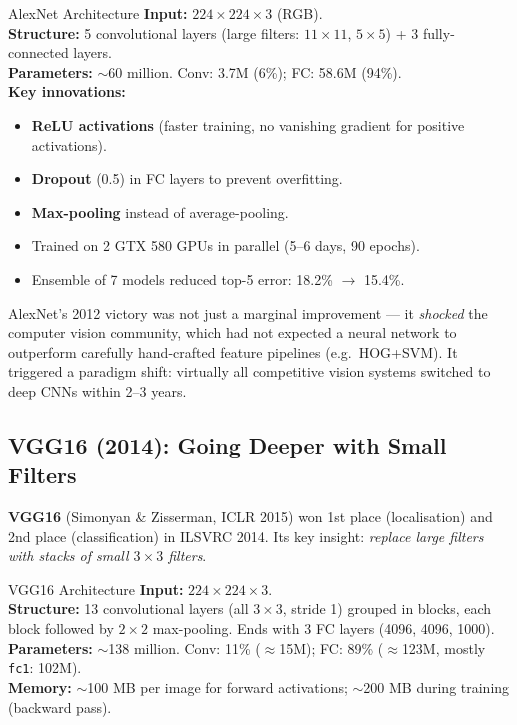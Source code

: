 \documentclass[11pt,a4paper]{article}
\newcommand{\term}[1]{\textcolor{DefGreen}{\textbf{#1}}}
\begin{document}
\begin{defbox}{AlexNet Architecture}
\textbf{Input:} $224\times224\times3$ (RGB).\\
\textbf{Structure:} 5 convolutional layers (large filters: $11\times11$, $5\times5$) + 3 fully-connected layers.\\
\textbf{Parameters:} $\sim$60 million. Conv: 3.7M (6\%); FC: 58.6M (94\%).\\
\textbf{Key innovations:}
\begin{itemize}
  \item \textbf{ReLU activations} (faster training, no vanishing gradient for positive activations).
  \item \textbf{Dropout} (0.5) in FC layers to prevent overfitting.
  \item \textbf{Max-pooling} instead of average-pooling.
  \item Trained on 2 GTX 580 GPUs in parallel (5–6 days, 90 epochs).
  \item Ensemble of 7 models reduced top-5 error: 18.2\% $\to$ 15.4\%.
\end{itemize}
\end{defbox}

\begin{insightbox}
AlexNet's 2012 victory was not just a marginal improvement — it \emph{shocked} the computer vision community, which had not expected a neural network to outperform carefully hand-crafted feature pipelines (e.g.\ HOG+SVM). It triggered a paradigm shift: virtually all competitive vision systems switched to deep CNNs within 2–3 years.
\end{insightbox}

\subsection{VGG16 (2014): Going Deeper with Small Filters}
\label{sec:vgg}

\term{VGG16} (Simonyan \& Zisserman, ICLR 2015) won 1st place (localisation) and 2nd place (classification) in ILSVRC 2014. Its key insight: \emph{replace large filters with stacks of small $3\times3$ filters}.

\begin{defbox}{VGG16 Architecture}
\textbf{Input:} $224\times224\times3$.\\
\textbf{Structure:} 13 convolutional layers (all $3\times3$, stride 1) grouped in blocks, each block followed by $2\times2$ max-pooling. Ends with 3 FC layers (4096, 4096, 1000).\\
\textbf{Parameters:} $\sim$138 million. Conv: 11\% ($\approx$15M); FC: 89\% ($\approx$123M, mostly \texttt{fc1}: 102M).\\
\textbf{Memory:} $\sim$100 MB per image for forward activations; $\sim$200 MB during training (backward pass).
\end{defbox}
\end{document}
